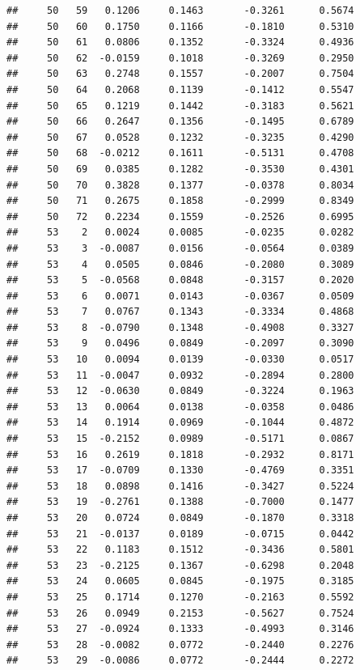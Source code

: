 \documentclass[
]{article}
\begin{document}
\begin{verbatim}
##     50   59   0.1206     0.1463       -0.3261      0.5674  
##     50   60   0.1750     0.1166       -0.1810      0.5310  
##     50   61   0.0806     0.1352       -0.3324      0.4936  
##     50   62  -0.0159     0.1018       -0.3269      0.2950  
##     50   63   0.2748     0.1557       -0.2007      0.7504  
##     50   64   0.2068     0.1139       -0.1412      0.5547  
##     50   65   0.1219     0.1442       -0.3183      0.5621  
##     50   66   0.2647     0.1356       -0.1495      0.6789  
##     50   67   0.0528     0.1232       -0.3235      0.4290  
##     50   68  -0.0212     0.1611       -0.5131      0.4708  
##     50   69   0.0385     0.1282       -0.3530      0.4301  
##     50   70   0.3828     0.1377       -0.0378      0.8034  
##     50   71   0.2675     0.1858       -0.2999      0.8349  
##     50   72   0.2234     0.1559       -0.2526      0.6995  
##     53    2   0.0024     0.0085       -0.0235      0.0282  
##     53    3  -0.0087     0.0156       -0.0564      0.0389  
##     53    4   0.0505     0.0846       -0.2080      0.3089  
##     53    5  -0.0568     0.0848       -0.3157      0.2020  
##     53    6   0.0071     0.0143       -0.0367      0.0509  
##     53    7   0.0767     0.1343       -0.3334      0.4868  
##     53    8  -0.0790     0.1348       -0.4908      0.3327  
##     53    9   0.0496     0.0849       -0.2097      0.3090  
##     53   10   0.0094     0.0139       -0.0330      0.0517  
##     53   11  -0.0047     0.0932       -0.2894      0.2800  
##     53   12  -0.0630     0.0849       -0.3224      0.1963  
##     53   13   0.0064     0.0138       -0.0358      0.0486  
##     53   14   0.1914     0.0969       -0.1044      0.4872  
##     53   15  -0.2152     0.0989       -0.5171      0.0867  
##     53   16   0.2619     0.1818       -0.2932      0.8171  
##     53   17  -0.0709     0.1330       -0.4769      0.3351  
##     53   18   0.0898     0.1416       -0.3427      0.5224  
##     53   19  -0.2761     0.1388       -0.7000      0.1477  
##     53   20   0.0724     0.0849       -0.1870      0.3318  
##     53   21  -0.0137     0.0189       -0.0715      0.0442  
##     53   22   0.1183     0.1512       -0.3436      0.5801  
##     53   23  -0.2125     0.1367       -0.6298      0.2048  
##     53   24   0.0605     0.0845       -0.1975      0.3185  
##     53   25   0.1714     0.1270       -0.2163      0.5592  
##     53   26   0.0949     0.2153       -0.5627      0.7524  
##     53   27  -0.0924     0.1333       -0.4993      0.3146  
##     53   28  -0.0082     0.0772       -0.2440      0.2276  
##     53   29  -0.0086     0.0772       -0.2444      0.2272  

\end{verbatim}
\end{document}
